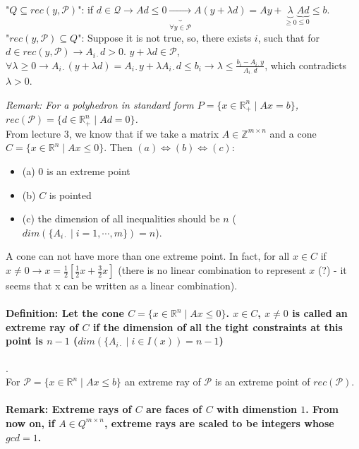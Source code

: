 \documentclass[main]{subfiles}
\begin{document}
"$Q \subseteq rec(y, \mathcal{P})$": if $d \in \mathcal{Q} \rightarrow Ad \leq
0 \underbrace{\rightarrow}_{\forall y \in \mathcal{P}} A (y + \lambda d) = Ay +
\underbrace{\lambda}_{\geq 0} \underbrace{A d}_{\leq 0} \leq b$. \\

"$rec(y, \mathcal{P}) \subseteq Q$": Suppose it is not true, so, there exists
$i$, such that for $d \in rec(y, \mathcal{P}) \rightarrow A_{i\cdot}d > 0$.
$y+ \lambda d \in \mathcal{P}$, $\forall \lambda \geq 0 \rightarrow A_{i\cdot}
(y + \lambda d) = A_{i\cdot}y + \lambda A_{i\cdot} d \leq b_i \rightarrow
\lambda \leq \frac{b_i - A_{i\cdot}y}{A_{i\cdot}d}$,
which contradicts $\lambda > 0$.


\emph{Remark: For a polyhedron in standard form $P=\{x \in \mathbb{R}^n_+ \mid
Ax = b \}$, $rec(\mathcal{P}) = \{d \in \mathbb{R}^n_+ \mid Ad = 0 \}$. }\\

From lecture 3, we know that if we take a matrix $A \in \mathbb{Z}^{m\times n}$
and a cone $C = \{x \in \mathbb{R}^n \mid Ax \leq 0 \}$. Then $(a) \iff (b)
\iff (c)$:
\begin{itemize}
\item (a) $0$ is an extreme point
\item (b) $C$ is pointed
\item (c) the dimension of all inequalities should be $n$ ($dim(\{A_{i\cdot} 
\mid i = 1, \cdots, m \}) = n$). 
\end{itemize}

A cone can not have more than one extreme point. In fact, for all $x \in C$ if
$x \neq 0 \rightarrow x = \frac{1}{2}[\frac{1}{2}x + \frac{3}{2}x]$ (there is
no linear combination to represent $x$ (?) - it seems that x can be written as
a linear combination).


\paragraph{Definition: Let the cone $C =\{x \in \mathbb{R}^n \mid Ax \leq 0\}$.
$x \in C$, $ x \neq 0$ is called an extreme ray of $C$ if the dimension of all
the tight constraints at this point is $n-1$ ($dim(\{A_{i\cdot} \mid i \in
I(x)) = n-1$)}.\\
For $\mathcal{P} = \{x \in \mathbb{R}^n \mid Ax \leq b \}$ an extreme ray of
$\mathcal{P}$ is an extreme point of $rec(\mathcal{P})$.

\paragraph{Remark: Extreme rays of $C$ are faces of $C$ with dimenstion $1$. 
From now on, if $A \in Q^{m \times n}$, extreme rays are scaled to be integers 
whose $gcd = 1$.}
\end{document}
